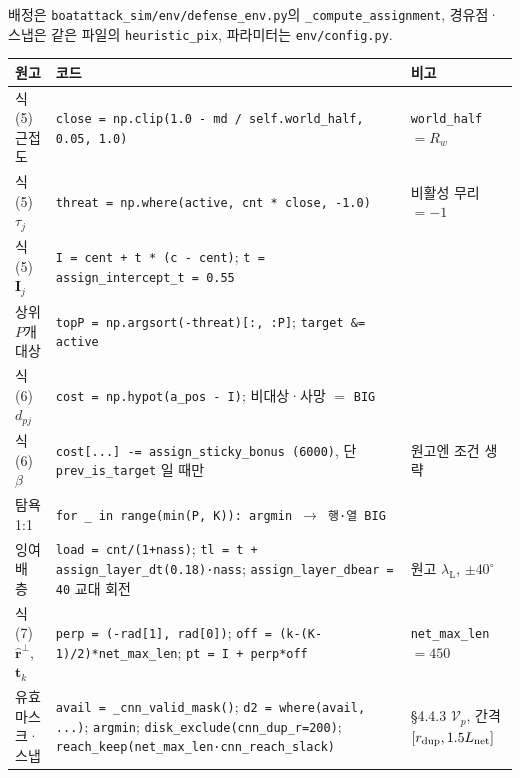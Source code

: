 \documentclass[11pt,a4paper]{article}
\newcommand{\bfI}{\mathbf{I}}
\newcommand{\bft}{\mathbf{t}}
\newcommand{\rhat}{\hat{\mathbf{r}}}
\newcommand{\lamL}{\lambda_{\mathrm{L}}}
\newcommand{\Lnet}{L_{\mathrm{net}}}
\begin{document}
배정은 \texttt{boatattack\_sim/env/defense\_env.py}의 \texttt{\_compute\_assignment}, 경유점·스냅은 같은 파일의 \texttt{heuristic\_pix}, 파라미터는 \texttt{env/config.py}.
\begin{table}[H]
\footnotesize
\begin{tabularx}{\textwidth}{>{\raggedright\arraybackslash}p{} >{\raggedright\arraybackslash}X >{\raggedright\arraybackslash}p{}}
\toprule
원고 & 코드 & 비고 \\
\midrule
식 (5) 근접도 & \texttt{close = np.clip(1.0 - md / self.world\_half, 0.05, 1.0)} & \texttt{world\_half} $=R_w$ \\
식 (5) $\tau_j$ & \texttt{threat = np.where(active, cnt * close, -1.0)} & 비활성 무리 $=-1$ \\
식 (5) $\bfI_j$ & \texttt{I = cent + t * (c - cent)}; \texttt{t = assign\_intercept\_t = 0.55} & \\
상위 $P$개 대상 & \texttt{topP = np.argsort(-threat)[:, :P]}; \texttt{target \&= active} & \\
식 (6) $d_{pj}$ & \texttt{cost = np.hypot(a\_pos - I)}; 비대상·사망 $=$ \texttt{BIG} & \\
식 (6) $\beta$ & \texttt{cost[...] -= assign\_sticky\_bonus (6000)}, 단 \texttt{prev\_is\_target} 일 때만 & 원고엔 조건 생략 \\
탐욕 1:1 & \texttt{for \_ in range(min(P, K)): argmin $\to$ 행·열 BIG} & \\
잉여 배 층 & \texttt{load = cnt/(1+nass)}; \texttt{tl = t + assign\_layer\_dt(0.18)·nass}; \texttt{assign\_layer\_dbear = 40} 교대 회전 & 원고 $\lamL$, $\pm40^\circ$ \\
식 (7) $\rhat^\perp$, $\bft_k$ & \texttt{perp = (-rad[1], rad[0])}; \texttt{off = (k-(K-1)/2)*net\_max\_len}; \texttt{pt = I + perp*off} & \texttt{net\_max\_len} $=450$ \\
유효 마스크·스냅 & \texttt{avail = \_cnn\_valid\_mask()}; \texttt{d2 = where(avail, ...)}; \texttt{argmin}; \texttt{disk\_exclude(cnn\_dup\_r=200)}; \texttt{reach\_keep(net\_max\_len·cnn\_reach\_slack)} & \S4.4.3 $\mathcal V_p$, 간격 $[r_{\rm dup}, 1.5\Lnet]$ \\
\bottomrule
\end{tabularx}
\end{table}
\end{document}
